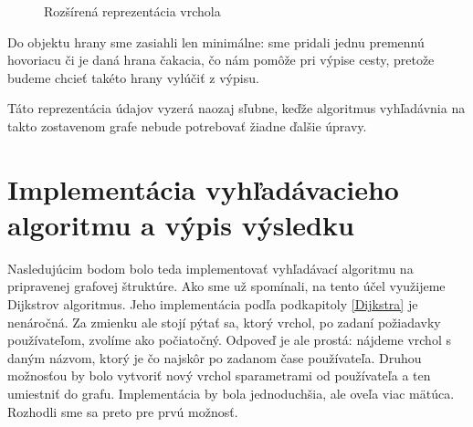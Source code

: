 \begin{figure}[H]
  \caption{Rozšírená reprezentácia vrchola}
  \label{2_Vertex}
\end{figure}

Do objektu hrany sme zasiahli len minimálne: sme pridali jednu premennú hovoriacu či je daná hrana čakacia, čo nám pomôže pri výpise cesty, pretože budeme chcieť takéto hrany vylúčiť z výpisu.\newline

Táto reprezentácia údajov vyzerá naozaj sľubne, keďže algoritmus vyhľadávnia na takto zostavenom grafe nebude potrebovať žiadne ďalšie úpravy.\newline


\section{Implementácia vyhľadávacieho algoritmu a výpis výsledku}

Nasledujúcim bodom bolo teda implementovať vyhľadávací algoritmu na pripravenej grafovej štruktúre. Ako sme už spomínali, na tento účel využijeme Dijkstrov algoritmus. Jeho implementácia podľa podkapitoly \ref{Dijkstra} je nenáročná. Za zmienku ale stojí pýtať sa, ktorý vrchol, po zadaní požiadavky používateľom, zvolíme ako počiatočný. Odpoveď je ale prostá: nájdeme vrchol s daným názvom, ktorý je čo najskôr po zadanom čase používateľa. Druhou možnosťou by bolo vytvoriť nový vrchol sparametrami od používateľa a ten umiestniť do grafu. Implementácia by bola jednoduchšia, ale oveľa viac mätúca. Rozhodli sme sa preto pre prvú možnosť.\newline

